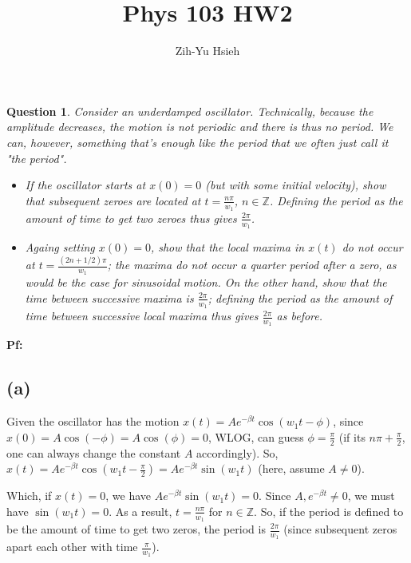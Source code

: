 \documentclass{article}
\title{Phys 103 HW2}
\author{Zih-Yu Hsieh}
\newtheorem{question}{Question}
\newcommand{\ZZ}{\mathbb{Z}}
\begin{document}
\maketitle

\section{}
\begin{question}\label{q1}
    Consider an underdamped oscillator. Technically, because the amplitude decreases, the motion is not periodic and there is thus no period. We can, however, something that's enough like the period that we often just call it "the period".
    \begin{itemize}
        \item[(a)] If the oscillator starts at $x(0)=0$ (but with some initial velocity), show that subsequent zeroes are located at $t=\frac{n\pi}{w_1}$, $n \in \ZZ$. Defining the period as the amount of time to get two zeroes thus gives $\frac{2\pi}{w_1}$.
        \item[(b)] Againg setting $x(0)=0$, show that the local maxima in $x(t)$ do not occur at $t=\frac{(2n+1/2)\pi}{w_1}$; the maxima do not occur a quarter period after a zero, as would be the case for sinusoidal motion. On the other hand, show that the time between successive maxima is $\frac{2\pi}{w_1}$; defining the period as the amount of time between successive local maxima thus gives $\frac{2\pi}{w_1}$ as before. 
    \end{itemize}
\end{question}

\textbf{Pf:}

\subsection*{(a)}
Given the oscillator has the motion $x(t)=Ae^{-\beta t}\cos(w_1t-\phi)$, since $x(0) = A\cos(-\phi)=A\cos(\phi)=0$, WLOG, can guess $\phi = \frac{\pi}{2}$ (if its $n\pi +\frac{\pi}{2}$, one can always change the constant $A$ accordingly). So, $x(t)=Ae^{-\beta t}\cos(w_1 t-\frac{\pi}{2})=Ae^{-\beta t}\sin(w_1 t)$ (here, assume $A\neq 0$).

Which, if $x(t) = 0$, we have $Ae^{-\beta t}\sin(w_1 t)=0$. Since $A, e^{-\beta t}\neq 0$, we must have $\sin(w_1 t)=0$. As a result, $t = \frac{n\pi}{w_1}$ for $n \in \ZZ$. So, if the period is defined to be the amount of time to get two zeros, the period is $\frac{2\pi}{w_1}$ (since subsequent zeros apart each other with time $\frac{\pi}{w_1}$).
\end{document}
